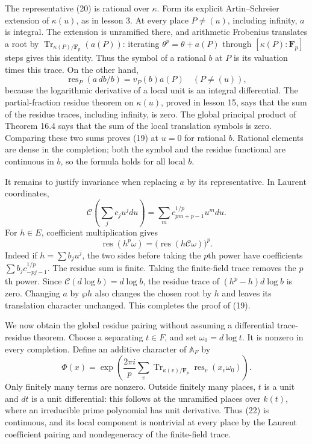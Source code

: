 \documentclass[11pt,a4paper]{article}
\begin{document}
The representative (20) is rational over \(\kappa\). Form its explicit
Artin--Schreier extension of \(\kappa(u)\), as in lesson 3. At every
place \(P\ne(u)\), including infinity, \(a\) is integral. The extension
is unramified there, and arithmetic Frobenius translates a root by
\(\operatorname{Tr}_{\kappa(P)/\mathbf F_p}(a(P))\): iterating
\(\theta^p=\theta+a(P)\) through \([\kappa(P):\mathbf F_p]\) steps gives
this identity. Thus the symbol of a rational \(b\) at \(P\) is its
valuation times this trace. On the other hand, \[
\operatorname{res}_P(a\,db/b)=v_P(b)a(P)
\quad(P\ne(u)),
\] because the logarithmic derivative of a local unit is an integral
differential. The partial-fraction residue theorem on \(\kappa(u)\),
proved in lesson 15, says that the sum of the residue traces, including
infinity, is zero. The global principal product of Theorem 16.4 says
that the sum of the local translation symbols is zero. Comparing these
two sums proves (19) at \(u=0\) for rational \(b\). Rational elements
are dense in the completion; both the symbol and the residue functional
are continuous in \(b\), so the formula holds for all local \(b\).

It remains to justify invariance when replacing \(a\) by its
representative. In Laurent coordinates, \[
\mathcal C\left(\sum_j c_j u^jdu\right)
=\sum_m c_{pm+p-1}^{1/p}u^mdu.
\tag{21}
\] For \(h\in E\), coefficient multiplication gives \[
\operatorname{res}(h^p\omega)
=\bigl(\operatorname{res}(h\mathcal C\omega)\bigr)^p.
\] Indeed if \(h=\sum b_j u^j\), the two sides before taking the \(p\)th
power have coefficients \(\sum b_j c_{-pj-1}^{1/p}\). The residue sum is
finite. Taking the finite-field trace removes the \(p\)th power. Since
\(\mathcal C(d\log b)=d\log b\), the residue trace of \((h^p-h)d\log b\)
is zero. Changing \(a\) by \(\wp h\) also changes the chosen root by
\(h\) and leaves its translation character unchanged. This completes the
proof of (19).

We now obtain the global residue pairing without assuming a differential
trace-residue theorem. Choose a separating \(t\in F\), and set
\(\omega_0=d\log t\). It is nonzero in every completion. Define an
additive character of \(\mathbb A_F\) by \[
\Phi(x)=\exp\left(\frac{2\pi i}{p}
\sum_v\operatorname{Tr}_{\kappa(v)/\mathbf F_p}
\operatorname{res}_v(x_v\omega_0)\right).
\tag{22}
\] Only finitely many terms are nonzero. Outside finitely many places,
\(t\) is a unit and \(dt\) is a unit differential: this follows at the
unramified places over \(k(t)\), where an irreducible prime polynomial
has unit derivative. Thus (22) is continuous, and its local component is
nontrivial at every place by the Laurent coefficient pairing and
nondegeneracy of the finite-field trace.
\end{document}
